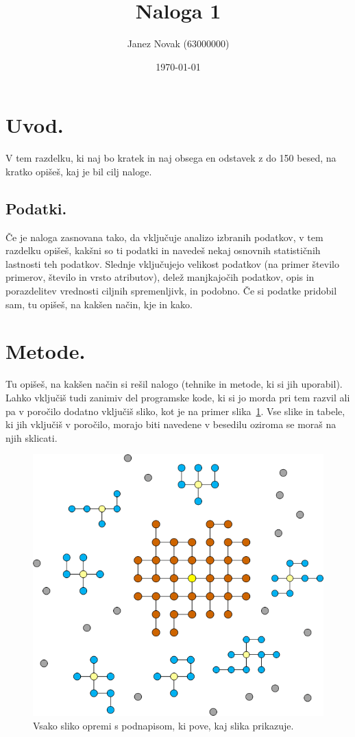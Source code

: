 \documentclass[a4paper,11pt]{article}
\title{Naloga 1}
\author{Janez Novak (63000000)}
\date{\today}
\begin{document}
\maketitle

\section{Uvod.}
V tem razdelku, ki naj bo kratek in naj obsega en odstavek z do 150
besed, na kratko opišeš, kaj je bil cilj naloge.

\subsection{Podatki.}
Če je naloga zasnovana tako, da vključuje analizo izbranih podatkov, v
tem razdelku opišeš, kakšni so ti podatki in navedeš nekaj osnovnih
statističnih lastnosti teh podatkov. Slednje vključujejo velikost
podatkov (na primer število primerov, število in vrsto atributov), delež
manjkajočih podatkov, opis in porazdelitev vrednosti ciljnih
spremenljivk, in podobno. Če si podatke pridobil sam, tu opišeš, na
kakšen način, kje in kako.

\section{Metode.}
Tu opišeš, na kakšen način si rešil nalogo (tehnike in metode, ki si
jih uporabil). Lahko vključiš tudi zanimiv del programske kode, ki
si jo morda pri tem razvil ali pa v poročilo dodatno vključiš sliko,
kot je na primer slika~\ref{slika1}. Vse slike in tabele, ki jih
vključiš v poročilo, morajo biti navedene v besedilu oziroma se moraš
na njih sklicati.

\begin{figure}[htbp]
\begin{center}
\includegraphics[scale=0.3]{slika-primer.png}
\caption{Vsako sliko opremi s podnapisom, ki pove, kaj slika prikazuje.}
\label{slika1}
\end{center}
\end{figure}
\end{document}
